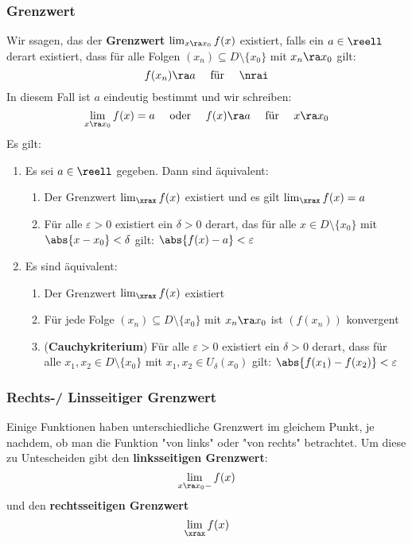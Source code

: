 \documentclass{kit}
\begin{document}
    \subsubsection{Grenzwert}
      Wir ssagen, das der \textbf{Grenzwert} $\lim_{x\ra x_0}f(x)$ existiert, falls ein $a\in\reell$ derart existiert, dass für alle Folgen $(x_n)\subseteq D\setminus\{x_0\}$ mit $x_n\ra x_0$ gilt:
      $$f(x_n)\ra a\quad\text{ für }\quad \nrai$$
      In diesem Fall ist $a$ eindeutig bestimmt und wir schreiben:
      $$\lim_{x\ra x_0}f(x)=a\quad\text{ oder }\quad f(x)\ra a\quad\text{ für }\quad x\ra x_0$$
      Es gilt:
      \begin{enumerate}
        \item Es sei $a\in\reell$ gegeben. Dann sind äquivalent:
          \begin{enumerate}[label=
oman*)]
            \item Der Grenzwert $\lim_\xrax f(x)$ existiert und es gilt $\lim_\xrax f(x)=a$
            \item Für alle $\varepsilon>0$ existiert ein $\delta>0$ derart, das für alle $x\in D\setminus\{x_0\}$ mit $\abs{x-x_0}<\delta$ gilt: $\abs{f(x)-a}<\varepsilon$
          \end{enumerate}
        \item Es sind äquivalent:
          \begin{enumerate}[label=
oman*)]
            \item Der Grenzwert $\lim_\xrax f(x)$ existiert
            \item Für jede Folge $(x_n)\subseteq D\setminus\{x_0\}$ mit $x_n\ra x_0$ ist $(f(x_n))$ konvergent
            \item (\textbf{Cauchykriterium}) Für alle $\varepsilon>0$ existiert ein $\delta>0$ derart, dass für alle $x_1,x_2\in D\setminus\{x_0\}$ mit $x_1,x_2\in U_\delta(x_0)$ gilt: $\abs{f(x_1)-f(x_2)}<\varepsilon$
          \end{enumerate}
      \end{enumerate}
    \subsubsection{Rechts-/ Linsseitiger Grenzwert}
      Einige Funktionen haben unterschiedliche Grenzwert im gleichem Punkt, je nachdem, ob man die Funktion "von links" oder "von rechts" betrachtet. Um diese zu Untescheiden gibt den \textbf{linksseitigen Grenzwert}:
      $$\lim_{x\ra x_0-}f(x)$$
      und den \textbf{rechtsseitigen Grenzwert}
      $$\lim_\xrax f(x)$$
\end{document}

